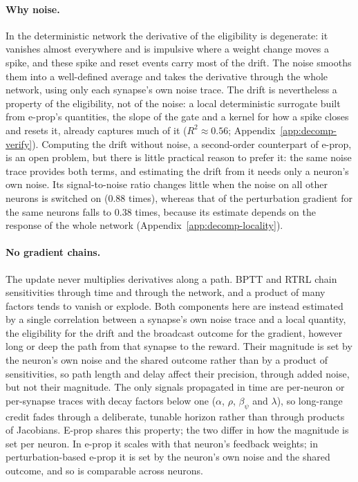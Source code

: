 \documentclass[10pt,twocolumn]{article}
\newcommand{\method}{perturbation-based e-prop}   %
\begin{document}
\paragraph{Why noise.}
In the deterministic network the derivative of the eligibility is degenerate: it
vanishes almost everywhere and is impulsive where a weight change moves a spike,
and these spike and reset events carry most of the drift. The noise smooths them
into a well-defined average and takes the derivative through the whole network,
using only each synapse's own noise trace. The drift is nevertheless a property
of the eligibility, not of the noise: a local deterministic surrogate built from
e-prop's quantities, the slope of the gate and a kernel for how a spike closes and
resets it, already captures much of it ($R^2\approx0.56$;
Appendix~\ref{app:decomp-verify}). Computing the drift without noise, a second-order
counterpart of e-prop, is an open problem, but there is little practical reason to
prefer it: the same noise trace provides both terms, and estimating the drift from
it needs only a neuron's own noise. Its signal-to-noise ratio changes little when the
noise on all other neurons is switched on ($0.88$ times), whereas that of the
perturbation gradient for the same neurons falls to $0.38$ times, because its
estimate depends on the response of the whole network
(Appendix~\ref{app:decomp-locality}).

\paragraph{No gradient chains.}
The update never multiplies derivatives along a path. BPTT and RTRL chain
sensitivities through time and through the network, and a product of many factors
tends to vanish or explode. Both components here are instead estimated by a single
correlation between a synapse's own noise trace and a local quantity, the
eligibility for the drift and the broadcast outcome for the gradient, however long
or deep the path from that synapse to the reward. Their magnitude is set by the
neuron's own noise and the shared outcome rather than by a product of
sensitivities, so path length and delay affect their precision, through added
noise, but not their magnitude. The only signals propagated in time are per-neuron
or per-synapse traces with decay factors below one ($\alpha$, $\rho$, $\beta_\psi$
and $\lambda$), so long-range credit fades through a deliberate, tunable horizon
rather than through products of Jacobians. E-prop shares this property; the two
differ in how the magnitude is set per neuron. In e-prop it scales with that
neuron's feedback weights; in \method{} it is set by the neuron's own noise and the
shared outcome, and so is comparable across neurons.
\end{document}
